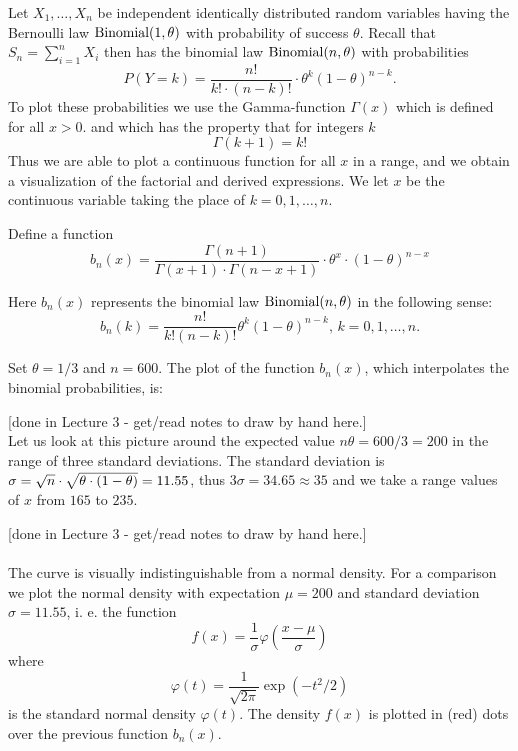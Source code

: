 Let $X_{1},\ldots ,X_{n}$ be independent identically distributed random
variables having the Bernoulli law $\mbox{{\rm Binomial}}(1,\theta)$ with probability of success $\theta$.
Recall that $S_{n}=\sum_{i=1}^{n}X_{i}$ then has the binomial law $\mbox{{\rm Binomial}}(n,\theta)$
with probabilities 
\begin{equation*}
P(Y=k)=\frac{n!}{k!\cdot (n-k)!}\cdot \theta^{k}(1-\theta)^{n-k}.
\end{equation*}%
To plot these probabilities we use the Gamma-function $\Gamma (x)$ which is
defined for all $x>0$. and which has the property that for integers $k$ 
\begin{equation*}
\Gamma (k+1)=k!
\end{equation*}%
Thus we are able to plot a continuous function for all $x$ in a range, and
we obtain a visualization of the factorial and derived expressions. We let $%
x $ be the continuous variable taking the place of $k=0,1,\ldots ,n$.

Define a function 
\begin{equation*}
b_{n}(x)=\frac{\Gamma (n+1)}{\Gamma (x+1)\cdot \Gamma (n-x+1)}\cdot
\theta^{x}\cdot (1-\theta)^{n-x}
\end{equation*}

Here $b_{n}(x)$ represents the binomial law $\mbox{{\rm Binomial}}(n,\theta)$ in the following sense: 
\begin{equation*}
b_{n}(k)=\frac{n!}{k!(n-k)!}\theta^{k}(1-\theta)^{n-k}\text{, }k=0,1,\ldots ,n.
\end{equation*}

Set $\theta=1/3$ and $n=600$. The plot of the function $b_{n}(x)$, which
interpolates the binomial probabilities, is:

\vspace{3cm} 
{\scriptsize [done in Lecture 3 - get/read notes to draw by hand here.]}\\

Let us look at this
picture around the expected value $n\theta=600/3=200$ in the range of three
standard deviations. The standard deviation is $\sigma =\sqrt{n}\cdot \sqrt{%
\theta \cdot (1-\theta)}=11.55$, thus $3\sigma =34.65\approx 35$ and we take a range
values of $x$ from $165$ to $235$.


{\scriptsize [done in Lecture 3 - get/read notes to draw by hand here.]}\\
\vspace{3cm} 
~\\


The curve is
visually indistinguishable from a normal density. For a comparison we plot
the normal density with expectation $\mu =200$ and standard deviation $%
\sigma =11.55$, i. e. the function 
\begin{equation*}
f(x)=\frac{1}{\sigma }\varphi \left( \frac{x-\mu }{\sigma }\right)
\end{equation*}%
where 
\begin{equation*}
\varphi \left( t\right) =\frac{1}{\sqrt{2\pi }}\exp \left( -t^{2}/2\right)
\end{equation*}%
is the standard normal density $\varphi \left( t\right) $. The density $f(x)$
is plotted in (red) dots over the previous function $b_{n}(x)$.

